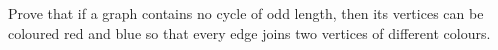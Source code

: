 Prove that if a graph contains no cycle of odd length, then its vertices can be coloured red and blue so that every edge joins two vertices of different colours.
